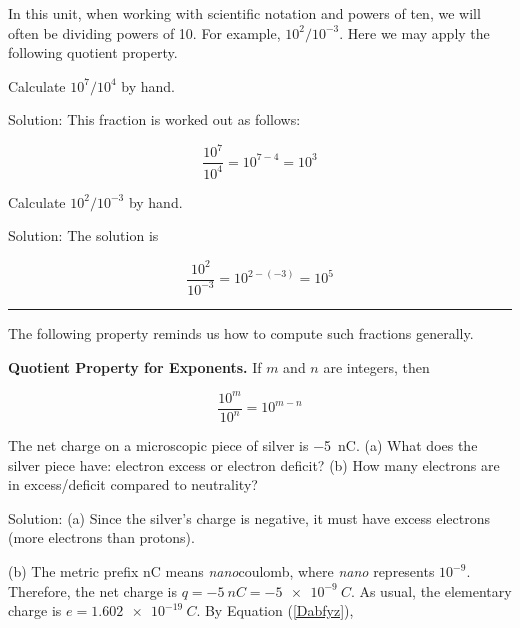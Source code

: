 \documentclass[dvipsnames]{article}
\begin{document}
In this unit, when working with scientific notation and powers of ten, we will often be dividing powers of 10. For example, $10^2/10^{-3}$. Here we may apply the following quotient property.


\begin{example}
    Calculate $10^7/10^4$ by hand.
\end{example}

Solution: This fraction is worked out as follows:

\begin{equation*}
    \frac{10^7}{10^4} = 10^{7-4} = 10^3
\end{equation*}

\begin{example}
    Calculate $10^2/10^{-3}$ by hand.
\end{example}

Solution: The solution is

\begin{equation*}
    \frac{10^2}{10^{-3}} = 10^{2 - (-3)} = 10^5
\end{equation*}

\hrule
\vspace{1em}

The following property reminds us how to compute such fractions generally.

\begin{center}
    \textbf{Quotient Property for Exponents.} If $m$ and $n$ are integers, then

    \begin{equation} \label{6Kyqsn}
        \frac{10^m}{10^n} = 10^{m-n}
    \end{equation}
\end{center}




\begin{example}
    The net charge on a microscopic piece of silver is \SI{-5}{nC}. (a) What does the silver piece have: electron excess or electron deficit? (b) How many electrons are in excess/deficit compared to neutrality?
\end{example}

Solution: (a) Since the silver's charge is negative, it must have excess electrons (more electrons than protons).

\vspace{1em}

(b) The metric prefix nC means \textit{nano}coulomb, where \textit{nano} represents $10^{-9}$. Therefore, the net charge is $q = \SI{-5}{nC} = \SI{-5e-9}{C}$. As usual, the elementary charge is $e= \SI{1.602e-19}{C}$. By Equation (\ref{Dabfyz}),
\end{document}
